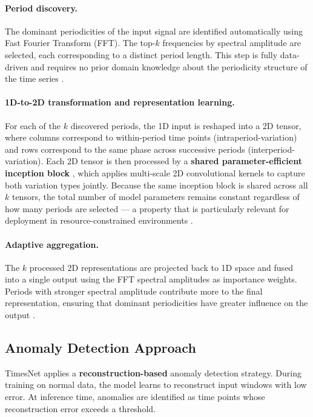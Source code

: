 \documentclass[twoside,11pt,openright]{report}
\begin{document}
\paragraph{Period discovery.}
The dominant periodicities of the input signal are identified automatically using
Fast Fourier Transform (FFT). The top-$k$ frequencies by spectral amplitude are
selected, each corresponding to a distinct period length. This step is fully
data-driven and requires no prior domain knowledge about the periodicity structure
of the time series \citep{timesnet2023}.

\paragraph{1D-to-2D transformation and representation learning.}
For each of the $k$ discovered periods, the 1D input is reshaped into a 2D tensor,
where columns correspond to within-period time points (intraperiod-variation) and
rows correspond to the same phase across successive periods (interperiod-variation).
Each 2D tensor is then processed by a \textbf{shared parameter-efficient inception
block} \citep{szegedy2015inception}, which applies multi-scale 2D convolutional
kernels to capture both variation types jointly. Because the same inception block
is shared across all $k$ tensors, the total number of model parameters remains
constant regardless of how many periods are selected --- a property that is
particularly relevant for deployment in resource-constrained environments
\citep{timesnet2023}.

\paragraph{Adaptive aggregation.}
The $k$ processed 2D representations are projected back to 1D space and fused into
a single output using the FFT spectral amplitudes as importance weights. Periods
with stronger spectral amplitude contribute more to the final representation,
ensuring that dominant periodicities have greater influence on the output
\citep{timesnet2023}.

\subsection{Anomaly Detection Approach}

TimesNet applies a \textbf{reconstruction-based} anomaly detection strategy. During
training on normal data, the model learns to reconstruct input windows with low
error. At inference time, anomalies are identified as time points whose
reconstruction error exceeds a threshold. 
\end{document}
